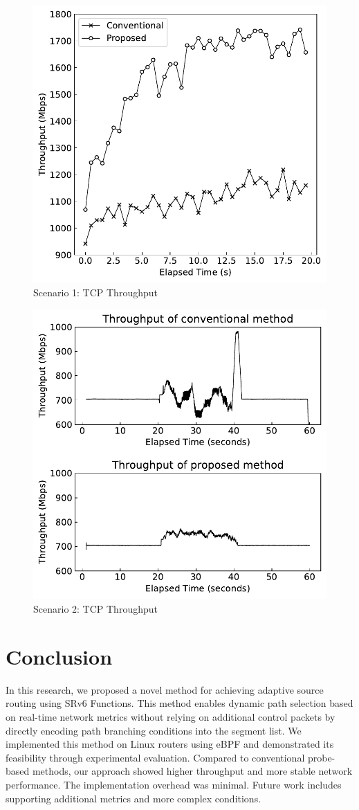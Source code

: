\documentclass[conference]{IEEEtran}
\begin{document}
\begin{figure}[t]
  \centering
  \includegraphics[width=0.7\linewidth]{./figures/scenario-1.pdf}
  \caption{Scenario 1: TCP Throughput}
  \label{fig:scenario-1}
\end{figure}

\begin{figure}[t]
  \centering
  \includegraphics[width=0.7\linewidth]{./figures/scenario-2.pdf}
  \caption{Scenario 2: TCP Throughput}
  \label{fig:scenario-2}
\end{figure}

\section{Conclusion}

In this research, we proposed a novel method for achieving adaptive source routing using SRv6 Functions.
This method enables dynamic path selection based on real-time network metrics without relying on additional control packets by directly encoding path branching conditions into the segment list.
We implemented this method on Linux routers using eBPF and demonstrated its feasibility through experimental evaluation.
Compared to conventional probe-based methods, our approach showed higher throughput and more stable network performance.
The implementation overhead was minimal.
Future work includes supporting additional metrics and more complex conditions.



\end{document}
